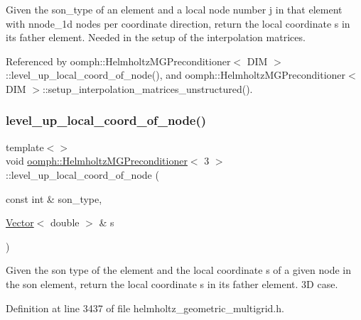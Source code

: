 Given the son\+\_\+type of an element and a local node number j in that element with nnode\+\_\+1d nodes per coordinate direction, return the local coordinate s in its father element. Needed in the setup of the interpolation matrices. 



Referenced by oomph\+::\+Helmholtz\+M\+G\+Preconditioner$<$ D\+I\+M $>$\+::level\+\_\+up\+\_\+local\+\_\+coord\+\_\+of\+\_\+node(), and oomph\+::\+Helmholtz\+M\+G\+Preconditioner$<$ D\+I\+M $>$\+::setup\+\_\+interpolation\+\_\+matrices\+\_\+unstructured().

\mbox{\label{classoomph_1_1HelmholtzMGPreconditioner_aa3b4679e9615fdcaf6516414c015b816}} 
\subsubsection{\texorpdfstring{level\+\_\+up\+\_\+local\+\_\+coord\+\_\+of\+\_\+node()}{level\_up\_local\_coord\_of\_node()}\hspace{0.1cm}{\footnotesize\ttfamily [2/3]}}
{\footnotesize\ttfamily template$<$$>$ \\
void \hyperlink{classoomph_1_1HelmholtzMGPreconditioner}{oomph\+::\+Helmholtz\+M\+G\+Preconditioner}$<$ 3 $>$\+::level\+\_\+up\+\_\+local\+\_\+coord\+\_\+of\+\_\+node (\begin{DoxyParamCaption}\item[{const int \&}]{son\+\_\+type,  }\item[{\hyperlink{classoomph_1_1Vector}{Vector}$<$ double $>$ \&}]{s }\end{DoxyParamCaption})}



Given the son type of the element and the local coordinate s of a given node in the son element, return the local coordinate s in its father element. 3D case. 



Definition at line 3437 of file helmholtz\+\_\+geometric\+\_\+multigrid.\+h.



